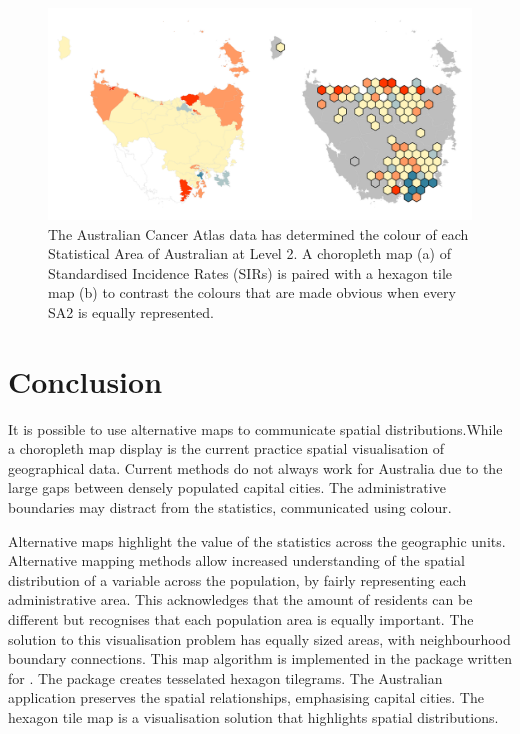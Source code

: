 \documentclass[
]{jss}
\begin{document}
\begin{CodeChunk}
\begin{figure}

{\centering \includegraphics[width=1\linewidth]{figures/7SIR} 

}

\caption[The Australian Cancer Atlas data has determined the colour of each Statistical Area of Australian at Level 2]{The Australian Cancer Atlas data has determined the colour of each Statistical Area of Australian at Level 2. A choropleth map (a) of Standardised Incidence Rates (SIRs) is paired with a hexagon tile map (b) to contrast the colours that are made obvious when every SA2 is equally represented.}\label{fig:sir}
\end{figure}
\end{CodeChunk}

\hypertarget{conclusion}{%
\section{Conclusion}\label{conclusion}}

It is possible to use alternative maps to communicate spatial
distributions.While a choropleth map display is the current practice
spatial visualisation of geographical data. Current methods do not
always work for Australia due to the large gaps between densely
populated capital cities. The administrative boundaries may distract
from the statistics, communicated using colour.

Alternative maps highlight the value of the statistics across the
geographic units. Alternative mapping methods allow increased
understanding of the spatial distribution of a variable across the
population, by fairly representing each administrative area. This
acknowledges that the amount of residents can be different but
recognises that each population area is equally important. The solution
to this visualisation problem has equally sized areas, with
neighbourhood boundary connections. This map algorithm is implemented in
the \citet{sugarbag} package written for \citet{R}. The 
package creates tesselated hexagon tilegrams. The Australian application
preserves the spatial relationships, emphasising capital cities. The
hexagon tile map is a visualisation solution that highlights spatial
distributions.


\end{document}
